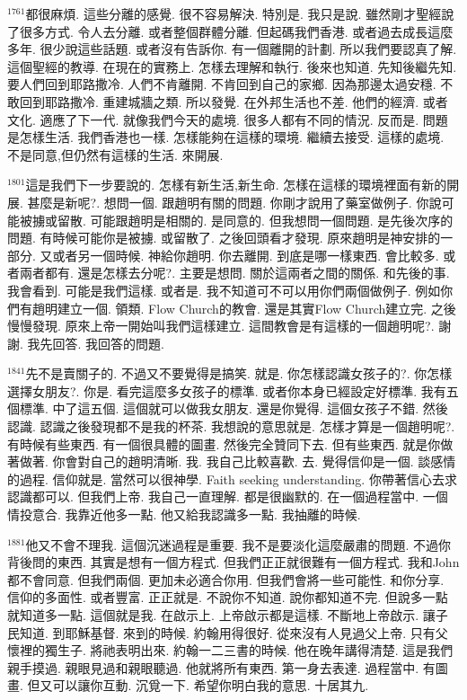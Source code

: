 \documentclass{book}
\begin{document}
$^{1761}$都很麻煩.
這些分離的感覺.
很不容易解決.
特別是.
我只是說.
雖然剛才聖經說了很多方式.
令人去分離.
或者整個群體分離.
但起碼我們香港.
或者過去成長這麼多年.
很少說這些話題.
或者沒有告訴你.
有一個離開的計劃.
所以我們要認真了解.
這個聖經的教導.
在現在的實務上.
怎樣去理解和執行.
後來也知道.
先知後繼先知.
要人們回到耶路撒冷.
人們不肯離開.
不肯回到自己的家鄉.
因為那邊太過安穩.
不敢回到耶路撒冷.
重建城牆之類.
所以發覺.
在外邦生活也不差.
他們的經濟.
或者文化.
適應了下一代.
就像我們今天的處境.
很多人都有不同的情況.
反而是.
問題是怎樣生活.
我們香港也一樣.
怎樣能夠在這樣的環境.
繼續去接受.
這樣的處境.
不是同意,但仍然有這樣的生活.
來開展.

$^{1801}$這是我們下一步要說的.
怎樣有新生活,新生命.
怎樣在這樣的環境裡面有新的開展.
甚麼是新呢?.
想問一個.
跟趙明有關的問題.
你剛才說用了藥室做例子.
你說可能被擄或留散.
可能跟趙明是相關的.
是同意的.
但我想問一個問題.
是先後次序的問題.
有時候可能你是被擄.
或留散了.
之後回頭看才發現.
原來趙明是神安排的一部分.
又或者另一個時候.
神給你趙明.
你去離開.
到底是哪一樣東西.
會比較多.
或者兩者都有.
還是怎樣去分呢?.
主要是想問.
關於這兩者之間的關係.
和先後的事.
我會看到.
可能是我們這樣.
或者是.
我不知道可不可以用你們兩個做例子.
例如你們有趙明建立一個.
領類.
Flow Church的教會.
還是其實Flow Church建立完.
之後慢慢發現.
原來上帝一開始叫我們這樣建立.
這間教會是有這樣的一個趙明呢?.
謝謝.
我先回答.
我回答的問題.

$^{1841}$先不是賣關子的.
不過又不要覺得是搞笑.
就是.
你怎樣認識女孩子的?.
你怎樣選擇女朋友?.
你是.
看完這麼多女孩子的標準.
或者你本身已經設定好標準.
我有五個標準.
中了這五個.
這個就可以做我女朋友.
還是你覺得.
這個女孩子不錯.
然後認識.
認識之後發現都不是我的杯茶.
我想說的意思就是.
怎樣才算是一個趙明呢?.
有時候有些東西.
有一個很具體的圖畫.
然後完全贊同下去.
但有些東西.
就是你做著做著.
你會對自己的趙明清晰.
我.
我自己比較喜歡.
去.
覺得信仰是一個.
談感情的過程.
信仰就是.
當然可以很神學.
Faith seeking understanding.
你帶著信心去求認識都可以.
但我們上帝.
我自己一直理解.
都是很幽默的.
在一個過程當中.
一個情投意合.
我靠近他多一點.
他又給我認識多一點.
我抽離的時候.

$^{1881}$他又不會不理我.
這個沉迷過程是重要.
我不是要淡化這麼嚴肅的問題.
不過你背後問的東西.
其實是想有一個方程式.
但我們正正就很難有一個方程式.
我和John都不會同意.
但我們兩個.
更加未必適合你用.
但我們會將一些可能性.
和你分享.
信仰的多面性.
或者豐富.
正正就是.
不說你不知道.
說你都知道不完.
但說多一點就知道多一點.
這個就是我.
在啟示上.
上帝啟示都是這樣.
不斷地上帝啟示.
讓子民知道.
到耶穌基督.
來到的時候.
約翰用得很好.
從來沒有人見過父上帝.
只有父懷裡的獨生子.
將祂表明出來.
約翰一二三書的時候.
他在晚年講得清楚.
這是我們親手摸過.
親眼見過和親眼聽過.
他就將所有東西.
第一身去表達.
過程當中.
有圖畫.
但又可以讓你互動.
沉覓一下.
希望你明白我的意思.
十居其九.
\end{document}

